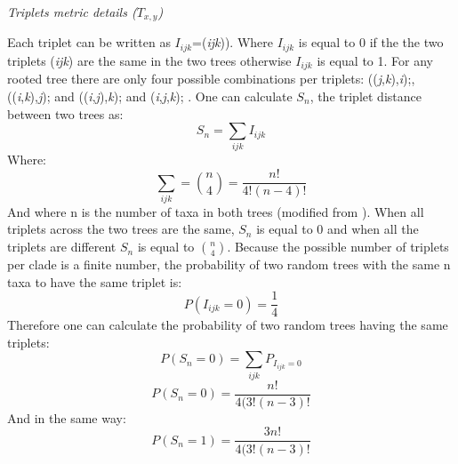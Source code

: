 \documentclass[12pt,letterpaper]{article}
\renewcommand{\subsection}[1]{%
\bigskip
\begin{center}
\begin{large}
\normalfont\itshape #1
\end{large}
\end{center}}
\begin{document}
\subsection{Triplets metric details ($T_{x,y}$)}
Each triplet can be written as $I_{ijk}$=(\textit{ijk})). Where $I_{ijk}$ is equal to 0 if the the two triplets (\textit{ijk}) are the same in the two trees otherwise $I_{ijk}$ is equal to 1.
For any rooted tree there are only four possible combinations per triplets: ((\textit{j},\textit{k}),\textit{i});, ((\textit{i},\textit{k}),\textit{j}); and ((\textit{i},\textit{j}),\textit{k}); and (\textit{i},\textit{j},\textit{k}); \citep{johnson1998}.
One can calculate $S_n$, the triplet distance between two trees as:
\begin{equation}
S_n = \sum_{ijk} I_{ijk}
\end{equation}
Where:
\begin{equation}
\sum_{ijk} = \binom{n}{4} = \frac{n!}{4!(n-4)!}
\end{equation}
And where n is the number of taxa in both trees (modified from \citet{critchlowthe1996}).
When all triplets across the two trees are the same, $S_n$ is equal to 0 and when all the triplets are different $S_n$ is equal to $\binom{n}{4}$.
Because the possible number of triplets per clade is a finite number, the probability of two random trees with the same n taxa to have the same triplet is:
\begin{equation}
P({I_{ijk}}=0) = \frac{1}{4}
\end{equation}
Therefore one can calculate the probability of two random trees having the same triplets: 
\begin{equation}
P({S_{n}}=0) = \sum_{ijk} P_{I_{ijk}=0}
\end{equation}
\begin{equation}
P({S_{n}}=0) = \frac{n!}{4(3!(n-3)!}
\end{equation}
And in the same way:
\begin{equation}
P({S_{n}}=1) = \frac{3n!}{4(3!(n-3)!}
\end{equation}
\end{document}
